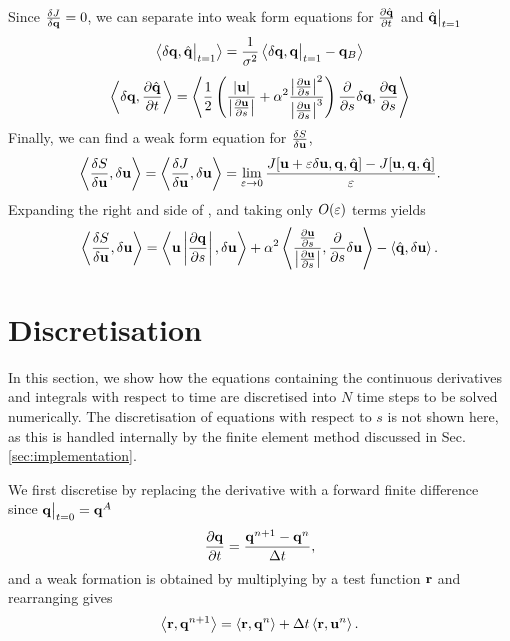 \documentclass[a4paper, 12pt]{article}
\begin{document}
Since $\frac{\delta J}{\delta \mathbf{q}} = 0$, we can separate  into weak form equations for $\frac{\partial \hat{\mathbf{q}}}{\partial t}$ and $\hat{\mathbf{q}} \big|_{t=1}$
  \begin{equation}
    \label{eq:qh_t1}
    \left\langle \delta \mathbf{q}, \hat{\mathbf{q}}\big|_{t=1} \right\rangle = 
    \frac{1}{\sigma^2}\left\langle \delta \mathbf{q}, \mathbf{q} \big|_{t=1} - \mathbf{q}_B \right\rangle
  \end{equation}
  \begin{equation}
    \label{eq:dqhdt}
    \left\langle \delta \mathbf{q}, \frac{\partial \hat{\mathbf{q}}}{\partial t} \right\rangle = 
    \left\langle \frac{1}{2}\left(\frac{\left|\mathbf{u}\right|}
        {\left|\frac{\partial \mathbf{u}}{\partial s}\right|} + 
        \alpha^2\frac{\left|\frac{\partial \mathbf{u}}{\partial s}\right|^2}
        {\left|\frac{\partial \mathbf{u}}{\partial s}\right|^3}\right)\frac{\partial }{\partial s}\delta \mathbf{q}, 
      \frac{\partial \mathbf{q}}{\partial s} \right\rangle
  \end{equation}
Finally, we can find a weak form equation for $\frac{\delta S}{\delta \mathbf{u}}$,
\begin{equation}
  \label{eq:var_dSdu-dJdu}
  \left\langle \frac{\delta S}{\delta \mathbf{u}}, \delta \mathbf{u} \right\rangle = \left\langle \frac{\delta J}{\delta \mathbf{u}}, 
    \delta \mathbf{u} \right\rangle =
  \lim_{\varepsilon \rightarrow 0} \frac{J[\mathbf{u} + \varepsilon \delta \mathbf{u}, \mathbf{q},
    \hat{\mathbf{q}}] 
    - J[\mathbf{u}, \mathbf{q}, \hat{\mathbf{q}}]}{\varepsilon}.
\end{equation}
Expanding the right and side of , and taking only $O(\varepsilon)$
terms yields
\begin{equation}
  \label{eq:dSdu-deltau}
  \left\langle \frac{\delta S}{\delta \mathbf{u}}, \delta \mathbf{u} \right\rangle = \left\langle \mathbf{u} \left|\frac{\partial \mathbf{q}}{\partial s}\right|,\delta \mathbf{u} \right\rangle 
  + \alpha^2 \left\langle \frac{\frac{\partial \mathbf{u}}{\partial s}}{\left|\frac{\partial \mathbf{u}}{\partial s}\right|},\frac{\partial }{\partial s}\delta \mathbf{u} \right\rangle
    - \left\langle \hat{\mathbf{q}},\delta \mathbf{u} \right\rangle.
\end{equation}

\section{Discretisation\label{sec:disc}}

In this section, we show how the equations containing the continuous derivatives
and integrals with respect to time are discretised into $N$ time steps to be
solved numerically. The discretisation of equations with respect to $s$ is not
shown here, as this is handled internally by the finite element method discussed
in Sec. \ref{sec:implementation}.

We first discretise  by replacing the derivative with a forward finite
difference since $\mathbf{q}\big|_{t=0} = \mathbf{q}^{A}$
\begin{equation}
  \label{eq:disc_dqdt}
  \frac{\partial \mathbf{q}}{\partial t} = \frac{\mathbf{q}^{n+1} - \mathbf{q}^n}{\Delta t},
\end{equation}
and a weak formation is obtained by multiplying by a test function $\mathbf{r}$ and
rearranging gives
\begin{equation}
  \label{eq:disc_q}
  \left\langle \mathbf{r}, \mathbf{q}^{n+1} \right\rangle = \left\langle \mathbf{r}, \mathbf{q}^n \right\rangle + \Delta t
    \left\langle \mathbf{r}, \mathbf{u}^n \right\rangle.
\end{equation}
\end{document}
